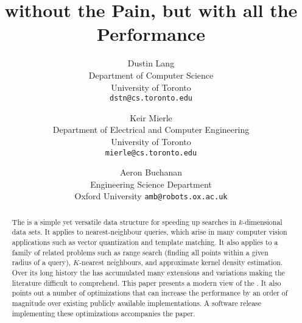 \documentclass[11pt,letterpaper]{article}
\begin{document}
\title{\Kdtrees without the Pain, but with all the Performance}

\author{Dustin Lang\\
Department of Computer Science\\
University of Toronto\\
{\tt\small dstn@cs.toronto.edu}
\and
Keir Mierle\\
Department of Electrical and Computer Engineering\\
University of Toronto\\
{\tt\small mierle@cs.toronto.edu}
\and
Aeron Buchanan\\
Engineering Science Department\\
Oxford University
{\tt\small amb@robots.ox.ac.uk}
}

\maketitle
\thispagestyle{empty}

\begin{abstract}
  The \kdtree is a simple yet versatile data structure for speeding
  up searches in $k$-dimensional data sets.  It applies to
  nearest-neighbour queries, which arise in many computer vision
  applications such as vector quantization and template matching.  It
  also applies to a family of related problems such as range search
  (finding all points within a given radius of a query), $K$-nearest
  neighbours, and approximate kernel density estimation.  Over its
  long history the \kdtree has accumulated many extensions and
  variations making the literature difficult to comprehend.  This
  paper presents a modern view of the \kdtree.  It also points out a
  number of optimizations that can increase the performance by an
  order of magnitude over existing publicly available implementations.  A software release implementing these
  optimizations accompanies the paper.
\end{abstract}



{\small


}
\end{document}
